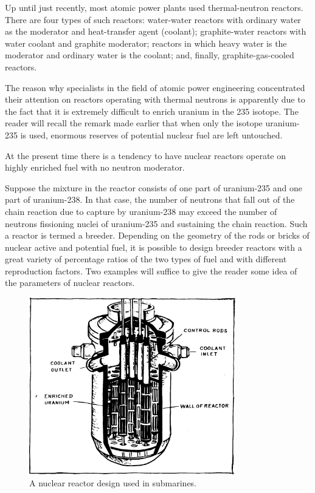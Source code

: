 Up until just recently, most atomic power plants used thermal-neutron reactors. There are four types of such reactors: water-water reactors with ordinary water as the moderator and heat-transfer agent (coolant); graphite-water reactors with water coolant and graphite moderator; reactors in which heavy water is the moderator and ordinary water is the coolant; and, finally, graphite-gas-cooled reactors.

The reason why specialists in the field of atomic power engineering concentrated their attention on reactors oper­ating with thermal neutrons is apparently due to the fact that it is extremely difficult to enrich uranium in the 235 isotope. The reader will recall the remark made earlier that when only the isotope uranium-235 is used, enormous reserves of potential nuclear fuel are left untouched.

At the present time there is a tendency to have nuclear reactors operate on highly enriched fuel with no neutron moderator.

Suppose the mixture in the reactor consists of one part of uranium-235 and one part of uranium-238. In that case, the number of neutrons that fall out of the chain reaction due to capture by uranium-238 may exceed the number of neutrons fissioning nuclei of uranium-235 and sustaining the chain reaction. Such a reactor is termed a breeder. Depending on the geometry of the rods or bricks of nuclear active and potential fuel, it is possible to design breeder reactors with a great variety of percentage ratios of the two types of fuel and with different reproduction factors. Two examples will suffice to give the reader some idea of the parameters of nuclear reactors.
\begin{figure}[!ht]
\centering
\includegraphics[width=0.8\textwidth]{figures/fig-06-02.pdf}
\caption{A nuclear reactor design used in submarines.}
\label{fig-6.2}
\end{figure}


